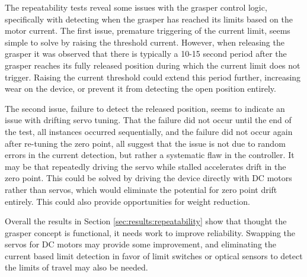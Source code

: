 The repeatability tests reveal some issues with the grasper control logic, specifically 
with detecting when the grasper has reached its limits based on the motor current. The first 
issue, premature triggering of the current limit, seems simple to solve by raising the threshold
current. However, when releasing the grasper it was observed that there is typically a 10-15 second
period after the grasper reaches its fully released position during which the current limit does not
trigger. Raising the current threshold could extend this period further, increasing wear on the device,
or prevent it from detecting the open position entirely. 

The second issue, failure to detect the released position, seems to indicate an issue with drifting 
servo tuning. That the failure did not occur until the end of the test, all instances occurred 
sequentially, and the failure did not occur again after re-tuning the zero point, all suggest that
the issue is not due to random errors in the current detection, but rather a systematic flaw in 
the controller. It may be that repeatedly driving the servo while stalled accelerates drift in the 
zero point. This could be solved by driving the device directly with DC motors rather than servos,
which would eliminate the potential for zero point drift entirely. This could also provide opportunities
for weight reduction. 

Overall the results in Section \ref{sec:results:repeatability} show that thought the grasper concept is functional, 
it needs work to improve reliability. Swapping the servos for DC motors may provide some improvement, 
and eliminating the current based limit detection in favor of limit switches or optical 
sensors to detect the limits of travel may also be needed.

